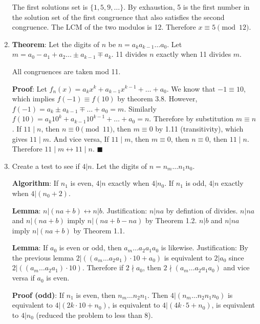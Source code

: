 \documentclass[12pt,letterpaper]{article}
\newcommand{\qedhere}{{\tiny \(\blacksquare\)}}
\begin{document}
\begin{enumerate}[leftmargin=0mm]
The first solutions set is \(\{1, 5, 9, \dots\}\). By exhaustion, 5 is the first number in the solution set of the first congruence that also satisfies the second congruence. The LCM of the two modulos is 12. Therefore \(x \equiv 5 \pmod{12}\).

\item \textbf{Theorem}: Let the digits of \(n\) be \(n = a_k a_{k-1} \dots a_0\). Let \(m = a_0 - a_1 + a_2 \dots \pm a_{k-1} \mp a_k\). 11 divides \(n\) exactly when 11 divides \(m\).

All congruences are taken mod 11.

\textbf{Proof}: Let \(f_n(x) = a_k x^k + a_{k-1} x^{k-1} + \dots + a_0\). We know that \(-1 \equiv 10\), which implies \(f(-1) \equiv f(10)\) by theorem 3.8. However, \(f(-1) = a_k \pm a_{k-1} \mp \dots + a_0 = m\). Similarly \(f(10) = a_k 10^k + a_{k-1} 10^{k-1} + \dots + a_0 = n\). Therefore by substitution \(m \equiv n\). If \(11 \mid n\), then \(n \equiv 0 \pmod{11}\), then \(m \equiv 0\) by 1.11 (transitivity), which gives \(11 \mid m\). And vice versa, If \(11 \mid m\), then \(m \equiv 0\), then \(n \equiv 0\), then \(11 \mid n\). Therefore \(11 \mid m \leftrightarrow 11 \mid n\). \qedhere

\item Create a test to see if \(4|n\). Let the digits of \(n = n_m \dots n_1 n_0\).


\textbf{Algorithm}: If \(n_1\) is even, \(4|n\) exactly when \(4|n_0\).  If \(n_1\) is odd, \(4|n\) exactly when \(4|(n_0 + 2)\).

\textbf{Lemma}: \(n|(na + b) \leftrightarrow n|b\). Justification: \(n|na\) by defintion of divides. \(n|na\) and \(n|(na + b)\) imply \(n|(na + b - na)\) by Theorem 1.2. \(n|b\) and \(n|na\) imply \(n|(na + b)\) by Theorem 1.1.

\textbf{Lemma}: If \(a_0\) is even or odd, then \(a_m \dots a_2 a_1 a_0\) is likewise. Justification: By the previous lemma \(2|((a_m \dots a_2 a_1) \cdot 10 + a_0)\) is equivalent to \(2|a_0\) since \(2|((a_m \dots a_2 a_1) \cdot 10)\). Therefore if \(2 \nmid a_0\), then \(2 \nmid (a_m \dots a_2 a_1 a_0)\) and vice versa if \(a_0\) is even.

\textbf{Proof (odd)}: If \(n_1\) is even, then \(n_m \dots n_2 n_1\). Then \(4|(n_m \dots n_2 n_1 n_0)\) is equivalent to \(4|(2k \cdot 10 + n_0)\), is equivalent to \(4|(4k \cdot 5 + n_0)\), is equivalent to \(4|n_0\) (reduced the problem to less than \(8\)).


\end{enumerate}
\end{document}
